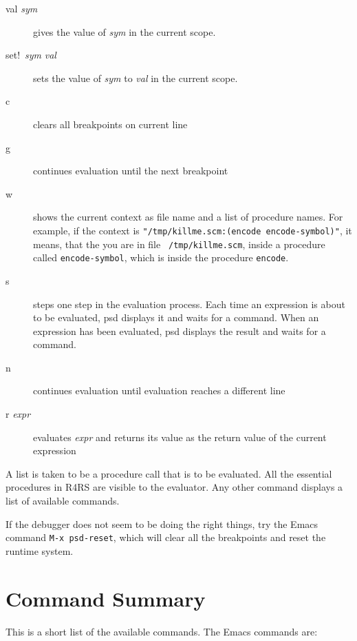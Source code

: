 \begin{description}
\item[val {\it sym}] 
  gives the value of {\it sym} in the current scope.

\item[set!\ {\it sym} {\it val}] 
  sets the value of {\it sym} to {\it val} in the current scope.

\item[c]
  clears all breakpoints on current line

\item[g]
  continues evaluation until the next breakpoint

\item[w]
  shows the current context as file name and a list of procedure names. For
  example, if the context is {\tt "/tmp/killme.scm:(encode
  encode-symbol)"}, it  means, that the you are in file {\tt
  /tmp/killme.scm}, inside a procedure called {\tt encode-symbol}, which
  is inside the procedure {\tt encode}.

\item[s] 
  steps one step in the evaluation process. Each time an expression is
  about to be evaluated, psd displays it and
  waits for a command. When an expression has been evaluated, psd
  displays the result and waits for a command.

\item[n] 
  continues evaluation until evaluation reaches a different line

\item[r {\it expr}] 
  evaluates {\it expr} and returns its value as the return value of the
  current expression

\end{description}

A list is taken to be a procedure call that is to be evaluated. All
the essential procedures in R4RS are visible to the evaluator. Any
other command displays a list of available commands.

If the debugger does not seem to be doing the right things, try the
Emacs command {\tt M-x psd-reset}, which will clear all the breakpoints
and reset the runtime system.

\section{Command Summary}

This is a short list of the available commands. The Emacs commands are:

